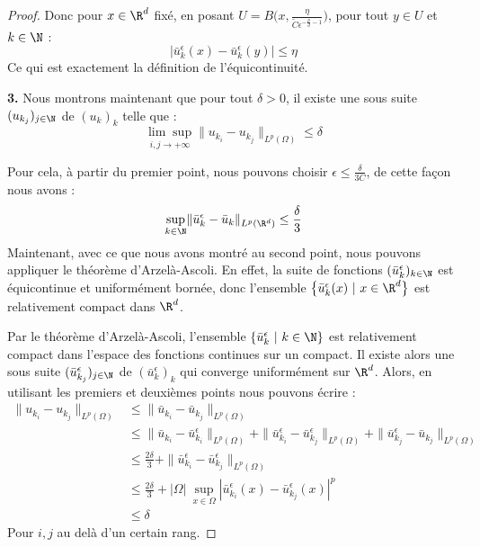 \begin{proof}
    Donc pour $x \in \R^d$ fixé, en posant $U = B\Big(x,\frac{\eta}{\tilde{C}\epsilon^{-\frac{p}{d} - 1}}\Big)$, pour tout $y\in U$ et $k\in \N$ :
    $$|\bar{u}_k^{\epsilon}(x) - \bar{u}_k^{\epsilon}(y)| \leq \eta $$
    Ce qui est exactement la définition de l'équicontinuité.
    \vspace{1em}

    \textbf{3.}
    Nous montrons maintenant que pour tout $\delta >0$, il existe une sous suite $(u_{k_j})_{j \in \N}$ de $(u_k)_k$ telle que :
    $$\underset{i,j \to +\infty}{\lim\sup} \| u_{k_i} - u_{k_j} \|_{L^p(\Omega)} \leq \delta$$

    Pour cela, à partir du premier point, nous pouvons choisir $\epsilon \leq \frac{\delta}{3C}$, de cette façon nous avons :
    $$ \underset{k \in \N}{\sup} \| \bar{u}_k^{\epsilon} - \bar{u}_k \|_{L^p(\R^d)} \leq \frac{\delta}{3} $$
    Maintenant, avec ce que nous avons montré au second point, nous pouvons appliquer le théorème d'Arzelà-Ascoli.
    En effet, la suite de fonctions $(\bar{u}_k^{\epsilon})_{k \in \N}$ est équicontinue et uniformément bornée, donc l'ensemble $\big\{ \bar{u}_k^{\epsilon}(x) \ | \ x \in \R^d \big\}$ est relativement compact dans $\R^d$.

    Par le théorème d'Arzelà-Ascoli, l'ensemble $\{ \bar{u}_k^{\epsilon} \ | \ k \in \N \}$ est relativement compact dans l'espace des fonctions continues sur un compact.
    Il existe alors une sous suite $(\bar{u}_{k_j}^{\epsilon})_{j\in\N}$ de $(\bar{u}_k^{\epsilon})_k$ qui converge uniformément sur $\R^d$. Alors, en utilisant les premiers et deuxièmes points nous pouvons écrire :
    \begin{equation*}
    \begin{split}
        \| u_{k_i} - u_{k_j} \|_{L^p(\Omega)} &\leq \| \bar{u}_{k_i} - \bar{u}_{k_j} \|_{L^p(\Omega)} \\
        &\leq \| \bar{u}_{k_i} - \bar{u}_{k_i}^{\epsilon} \|_{L^p(\Omega)} + \| \bar{u}_{k_i}^{\epsilon} - \bar{u}_{k_j}^{\epsilon} \|_{L^p(\Omega)} + \| \bar{u}_{k_j}^{\epsilon} - \bar{u}_{k_j} \|_{L^p(\Omega)} \\
        &\leq \frac{2\delta}{3} + \| \bar{u}_{k_i}^{\epsilon} - \bar{u}_{k_j}^{\epsilon} \|_{L^p(\Omega)} \\
        &\leq \frac{2\delta}{3} + |\Omega| \ \underset{x \in \Omega}{\sup}|\bar{u}_{k_i}^{\epsilon}(x) - \bar{u}_{k_j}^{\epsilon}(x)|^p \\
        &\leq \delta
    \end{split}
    \end{equation*}
    Pour $i,j$ au delà d'un certain rang.


\end{proof}
